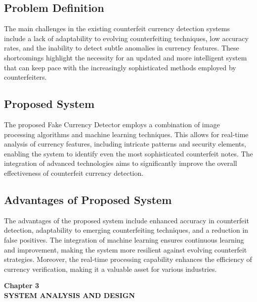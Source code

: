 \documentclass[12pt]{article}
\begin{document}
 \subsection{Problem Definition}
The main challenges in the existing counterfeit currency detection systems include a lack of adaptability to evolving counterfeiting techniques, low accuracy rates, and the inability to detect subtle anomalies in currency features. These shortcomings highlight the necessity for an updated and more intelligent system that can keep pace with the increasingly sophisticated methods employed by counterfeiters.
 \subsection{Proposed System}
The proposed Fake Currency Detector employs a combination of image processing algorithms and machine learning techniques. This allows for real-time analysis of currency features, including intricate patterns and security elements, enabling the system to identify even the most sophisticated counterfeit notes. The integration of advanced technologies aims to significantly improve the overall effectiveness of counterfeit currency detection.
 \subsection{Advantages of Proposed System}
The advantages of the proposed system include enhanced accuracy in counterfeit detection, adaptability to emerging counterfeiting techniques, and a reduction in false positives. The integration of machine learning ensures continuous learning and improvement, making the system more resilient against evolving counterfeit strategies. Moreover, the real-time processing capability enhances the efficiency of currency verification, making it a valuable asset for various industries.



\clearpage





\begin{center}
 \LARGE \textbf {Chapter 3 }\\[10mm]
 \Large \textbf{SYSTEM ANALYSIS AND DESIGN}\\[10mm]
 \end{center}
\end{document}
